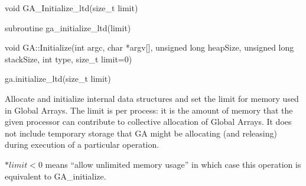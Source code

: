 \documentclass[12pt]{article}
\begin{document}


\begin{capi}
\begin{ccode}
void GA_Initialize_ltd(size_t limit)
\end{ccode}
\begin{funcargs}
\end{funcargs}
\end{capi}

\begin{fapi}
\begin{fcode}
subroutine ga_initialize_ltd(limit)
\end{fcode}
\begin{funcargs}
\end{funcargs}
\end{fapi}

\begin{cxxapi}
\begin{cxxcode}
void GA::Initialize(int argc, char *argv[], unsigned long heapSize,
                    unsigned long stackSize, int type, size_t limit=0)
\end{cxxcode}
\begin{funcargs}
\end{funcargs}
\end{cxxapi}

\begin{pyapi}
\begin{pycode}
ga.initialize_ltd(size_t limit)
\end{pycode}
\begin{funcargs}
\end{funcargs}
\end{pyapi}

\gcoll

\begin{desc}

Allocate and initialize internal data structures and set the limit for memory
used in Global Arrays. The limit is per process: it is the amount of memory
that the given processor can contribute to collective allocation of Global
Arrays. It does not include temporary storage that GA might be allocating (and
releasing) during execution of a particular operation.

$*limit < 0$ means ``allow unlimited memory usage'' in which case this operation
is equivalent to GA_initialize.

\end{desc}
\end{document}
